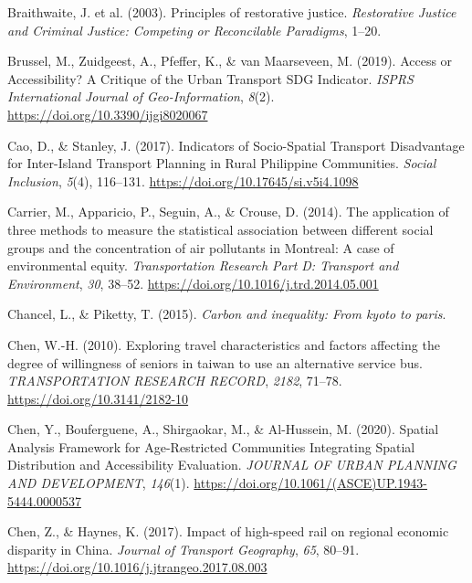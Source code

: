 \documentclass[
  letterpaper,
  DIV=11,
  numbers=noendperiod]{scrartcl}
\newlength{\cslhangindent}
\newenvironment{CSLReferences}[2] %
 {\begin{list}{}{%
  \setlength{\itemindent}{0pt}
  \setlength{\leftmargin}{0pt}
  \setlength{\parsep}{0pt}
  \ifodd #1
   \setlength{\leftmargin}{\cslhangindent}
   \setlength{\itemindent}{-1\cslhangindent}
  \fi
  \setlength{\itemsep}{#2\baselineskip}}}
 {\end{list}}
\begin{document}
\begin{CSLReferences}{1}{0}
Braithwaite, J. et al. (2003). Principles of restorative justice.
\emph{Restorative Justice and Criminal Justice: Competing or
Reconcilable Paradigms}, 1--20.

Brussel, M., Zuidgeest, A., Pfeffer, K., \& van Maarseveen, M. (2019).
Access or {Accessibility}? {A Critique} of the {Urban Transport SDG
Indicator}. \emph{ISPRS International Journal of Geo-Information},
\emph{8}(2). \url{https://doi.org/10.3390/ijgi8020067}

Cao, D., \& Stanley, J. (2017). Indicators of {Socio-Spatial Transport
Disadvantage} for {Inter-Island Transport Planning} in {Rural Philippine
Communities}. \emph{Social Inclusion}, \emph{5}(4), 116--131.
\url{https://doi.org/10.17645/si.v5i4.1098}

Carrier, M., Apparicio, P., Seguin, A., \& Crouse, D. (2014). The
application of three methods to measure the statistical association
between different social groups and the concentration of air pollutants
in {Montreal}: {A} case of environmental equity. \emph{Transportation
Research Part D: Transport and Environment}, \emph{30}, 38--52.
\url{https://doi.org/10.1016/j.trd.2014.05.001}

Chancel, L., \& Piketty, T. (2015). \emph{Carbon and inequality: From
kyoto to paris}.

Chen, W.-H. (2010). Exploring travel characteristics and factors
affecting the degree of willingness of seniors in taiwan to use an
alternative service bus. \emph{{TRANSPORTATION} {RESEARCH} {RECORD}},
\emph{2182}, 71--78. \url{https://doi.org/10.3141/2182-10}

Chen, Y., Bouferguene, A., Shirgaokar, M., \& Al-Hussein, M. (2020).
Spatial {Analysis Framework} for {Age-Restricted Communities Integrating
Spatial Distribution} and {Accessibility Evaluation}. \emph{JOURNAL OF
URBAN PLANNING AND DEVELOPMENT}, \emph{146}(1).
\url{https://doi.org/10.1061/(ASCE)UP.1943-5444.0000537}

Chen, Z., \& Haynes, K. (2017). Impact of high-speed rail on regional
economic disparity in {China}. \emph{Journal of Transport Geography},
\emph{65}, 80--91. \url{https://doi.org/10.1016/j.jtrangeo.2017.08.003}


\end{CSLReferences}
\end{document}
